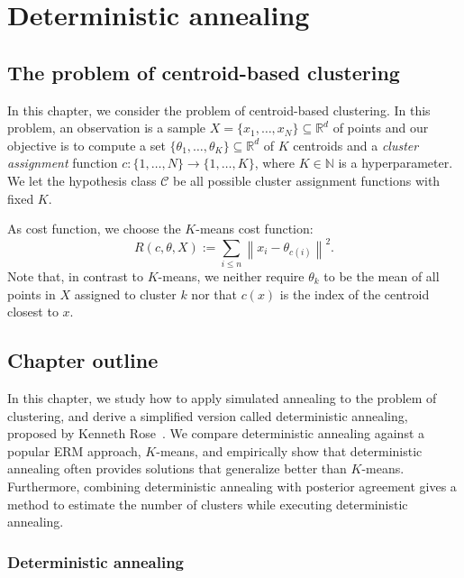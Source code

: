 \chapter{Deterministic annealing}
\label{ch:da}

\newcommand{\facprob}[4]{p_{#1}
\left(#2\mid #3, #4\right)
}

\section{The problem of centroid-based clustering}
\label{sec:problem}

In this chapter, we consider the problem of centroid-based clustering. In
this problem, an observation is a sample $X = \{x_1, \ldots, x_N\} \subseteq \mathbb{R}^d$ of points
and our objective is to compute a set $\{\theta_1, \ldots, \theta_K\} \subseteq \mathbb{R}^d$ of $K$ centroids and a \emph{cluster assignment} function $c : \{1, \ldots, N\} \to \{1, \ldots, K\}$, where $K \in \mathbb{N}$ is a hyperparameter.
We let the hypothesis class $\mathcal{C}$ be all possible cluster assignment functions with fixed $K$.

As cost function, we choose the $K$-means cost function:
%
\begin{equation}
R(c, \theta, X) := \sum_{i \leq n} \left\|x_i - \theta_{c(i)}\right\|^2.
\label{eq:k_means_cost_fun}
\end{equation}
%
Note that, in contrast to $K$-means, we neither require $\theta_k$ to be the mean of all points in $X$ assigned to cluster $k$ nor that $c(x)$ is the index of the centroid closest to $x$.

\section{Chapter outline}
\label{sec:chapter_outline}

In this chapter, we study how to apply simulated annealing to the problem
of clustering, and derive a simplified version called deterministic annealing, proposed by Kenneth Rose~\cite{rose1998deterministic}. We compare deterministic annealing
against a popular ERM approach, $K$-means, and empirically show that deterministic annealing often provides solutions that generalize better than
$K$-means. Furthermore, combining deterministic annealing with posterior
agreement gives a method to estimate the number of clusters while executing
deterministic annealing.

\subsection*{Deterministic annealing}

